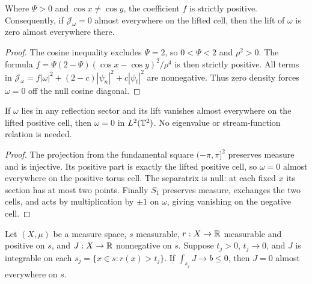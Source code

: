 \begin{lemma}
\label{lem:ee-vorticity-from-density}
\leanok
Where $\Psi>0$ and $\cos x\ne\cos y$, the coefficient $f$ is strictly positive.
Consequently, if $\mathcal J_\omega=0$ almost everywhere on the lifted cell, then
the lift of $\omega$ is zero almost everywhere there.
\end{lemma}

\begin{proof}
\leanok
The cosine inequality excludes $\Psi=2$, so $0<\Psi<2$ and $\rho^2>0$.
The formula $f=\Psi(2-\Psi)(\cos x-\cos y)^2/\rho^4$ is then strictly positive.
All terms in $\mathcal J_\omega=f|\omega|^2+(2-c)|\psi_n|^2+c|\psi_t|^2$
are nonnegative. Thus zero density forces $\omega=0$ off the null cosine diagonal.
\end{proof}

\begin{lemma}
\label{lem:ee-cell-vanishing}
\leanok
If $\omega$ lies in any reflection sector and its lift vanishes almost
everywhere on the lifted positive cell, then $\omega=0$ in $L^2(\mathbb{T}^2)$.
No eigenvalue or stream-function relation is needed.
\end{lemma}

\begin{proof}
\leanok
The projection from the fundamental square $(-\pi,\pi]^2$ preserves measure and is
injective. Its positive part is exactly the lifted positive cell, so $\omega=0$
almost everywhere on the positive torus cell. The separatrix is null: at each fixed
$x$ its section has at most two points. Finally $S_1$ preserves measure, exchanges
the two cells, and acts by multiplication by $\pm1$ on $\omega$, giving
vanishing on the negative cell.
\end{proof}

\begin{lemma}
\label{lem:nonnegative-exhaustion}
\leanok
Let $(X,\mu)$ be a measure space, $s$ measurable, $r:X\to\mathbb{R}$ measurable and positive on
$s$, and $J:X\to\mathbb{R}$ nonnegative on $s$. Suppose $t_j>0$, $t_j\to0$, and $J$ is integrable
on each $s_j=\{x\in s:r(x)>t_j\}$. If $\int_{s_j}J\to b\le0$, then $J=0$ almost everywhere
on $s$.
\end{lemma}

